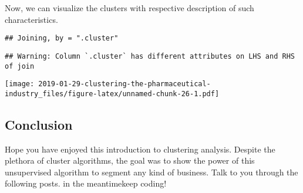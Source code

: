 \documentclass[]{article}
\newenvironment{Shaded}{\begin{snugshade}}{\end{snugshade}}
\newcommand{\KeywordTok}[1]{\textcolor[rgb]{0.13,0.29,0.53}{\textbf{#1}}}
\newcommand{\DataTypeTok}[1]{\textcolor[rgb]{0.13,0.29,0.53}{#1}}
\newcommand{\DecValTok}[1]{\textcolor[rgb]{0.00,0.00,0.81}{#1}}
\newcommand{\StringTok}[1]{\textcolor[rgb]{0.31,0.60,0.02}{#1}}
\newcommand{\CommentTok}[1]{\textcolor[rgb]{0.56,0.35,0.01}{\textit{#1}}}
\newcommand{\OtherTok}[1]{\textcolor[rgb]{0.56,0.35,0.01}{#1}}
\newcommand{\OperatorTok}[1]{\textcolor[rgb]{0.81,0.36,0.00}{\textbf{#1}}}
\newcommand{\NormalTok}[1]{#1}
\begin{document}
Now, we can visualize the clusters with respective description of such
characteristics.

\begin{Shaded}
\end{Shaded}

\begin{verbatim}
## Joining, by = ".cluster"
\end{verbatim}

\begin{verbatim}
## Warning: Column `.cluster` has different attributes on LHS and RHS of join
\end{verbatim}

\texttt{[image: 2019-01-29-clustering-the-pharmaceutical-industry\_files/figure-latex/unnamed-chunk-26-1.pdf]}

\subsection{Conclusion}\label{conclusion}

Hope you have enjoyed this introduction to clustering analysis. Despite
the plethora of cluster algorithms, the goal was to show the power of
this unsupervised algorithm to segment any kind of business. Talk to you
through the following posts. in the meantimekeep coding!
\end{document}
